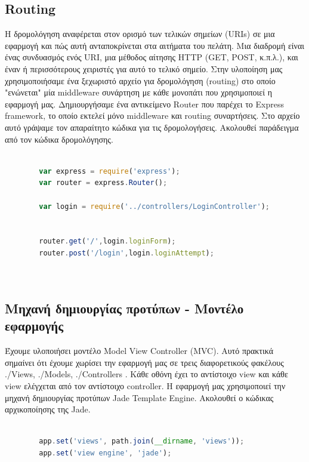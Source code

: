 		\subsection{Routing}
	
		Η δρομολόγηση αναφέρεται στον ορισμό των τελικών σημείων (URIs) σε μια εφαρμογή και πώς αυτή ανταποκρίνεται στα αιτήματα του πελάτη. Μια διαδρομή είναι ένας συνδυασμός ενός URI, μια μέθοδος αίτησης HTTP (GET, POST, κ.π.λ.), και έναν ή περισσότερους χειριστές για αυτό το τελικό σημείο. 
		Στην υλοποίηση μας χρησιμοποιήσαμε ένα ξεχωριστό αρχείο για δρομολόγηση (routing) στο οποίο "ενώνεται" μία middleware συνάρτηση με κάθε μονοπάτι που χρησιμοποιεί η εφαρμογή μας. Δημιουργήσαμε ένα αντικείμενο Router που παρέχει το Express framework, το οποίο εκτελεί μόνο middleware και routing συναρτήσεις. Στο αρχείο αυτό γράψαμε τον απαραίτητο κώδικα για τις δρομολογήσεις. Ακολουθεί παράδειγμα από τον κώδικα δρομολόγησης.

		\begin{lstlisting}[language=Javascript]			
		
		var express = require('express');
		var router = express.Router(); 

		var login = require('../controllers/LoginController');


		router.get('/',login.loginForm); 
		router.post('/login',login.loginAttempt);
	
	
	 		\end{lstlisting}
	 		
	\subsection*{Μηχανή δημιουργίας προτύπων - Μοντέλο εφαρμογής }

		Έχουμε υλοποιήσει μοντέλο Model View Controller (MVC). Αυτό πρακτικά σημαίνει ότι έχουμε χωρίσει την εφαρμογή μας σε τρεις διαφορετικούς φακέλους  ./Views, ./Models, ./Controllers . Κάθε οθόνη έχει το αντίστοιχο view και κάθε view ελέγχεται από τον αντίστοιχο controller.  
		Η εφαρμογή μας χρησιμοποιεί την μηχανή δημιουργίας προτύπων Jade Template Engine. Ακολουθεί ο κώδικας αρχικοποίησης της Jade.
		
		\begin{lstlisting}[language=Javascript]			
		
		app.set('views', path.join(__dirname, 'views'));
		app.set('view engine', 'jade');
	
		\end{lstlisting}
		
